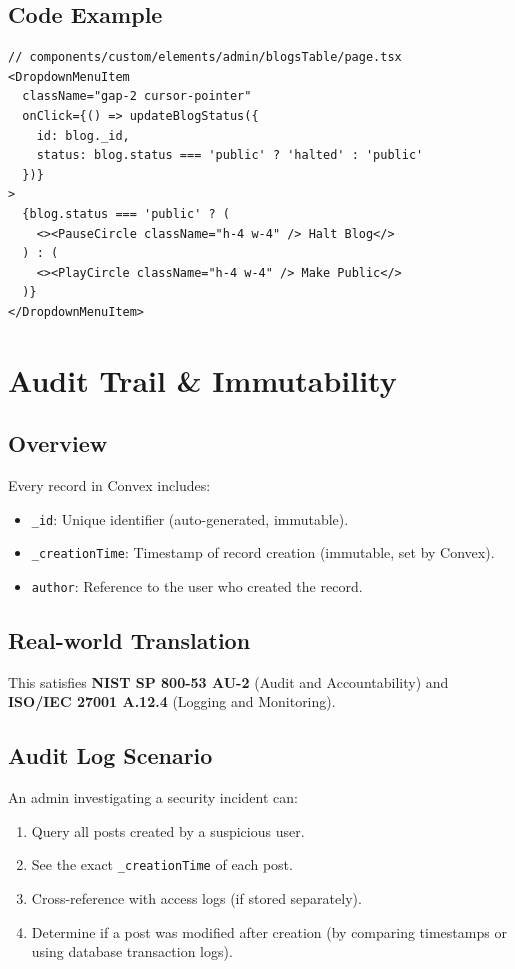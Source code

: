 \documentclass[11pt,a4paper]{article}
\begin{document}
\subsection{Code Example}
\begin{lstlisting}
// components/custom/elements/admin/blogsTable/page.tsx
<DropdownMenuItem
  className="gap-2 cursor-pointer"
  onClick={() => updateBlogStatus({ 
    id: blog._id, 
    status: blog.status === 'public' ? 'halted' : 'public' 
  })}
>
  {blog.status === 'public' ? (
    <><PauseCircle className="h-4 w-4" /> Halt Blog</>
  ) : (
    <><PlayCircle className="h-4 w-4" /> Make Public</>
  )}
</DropdownMenuItem>
\end{lstlisting}

\section{Audit Trail \& Immutability}

\subsection{Overview}
Every record in Convex includes:
\begin{itemize}
    \item \texttt{\_id}: Unique identifier (auto-generated, immutable).
    \item \texttt{\_creationTime}: Timestamp of record creation (immutable, set by Convex).
    \item \texttt{author}: Reference to the user who created the record.
\end{itemize}

\subsection{Real-world Translation}
This satisfies \textbf{NIST SP 800-53 AU-2} (Audit and Accountability) and \textbf{ISO/IEC 27001 A.12.4} (Logging and Monitoring).

\subsection{Audit Log Scenario}
An admin investigating a security incident can:
\begin{enumerate}
    \item Query all posts created by a suspicious user.
    \item See the exact \texttt{\_creationTime} of each post.
    \item Cross-reference with access logs (if stored separately).
    \item Determine if a post was modified after creation (by comparing timestamps or using database transaction logs).
\end{enumerate}
\end{document}
